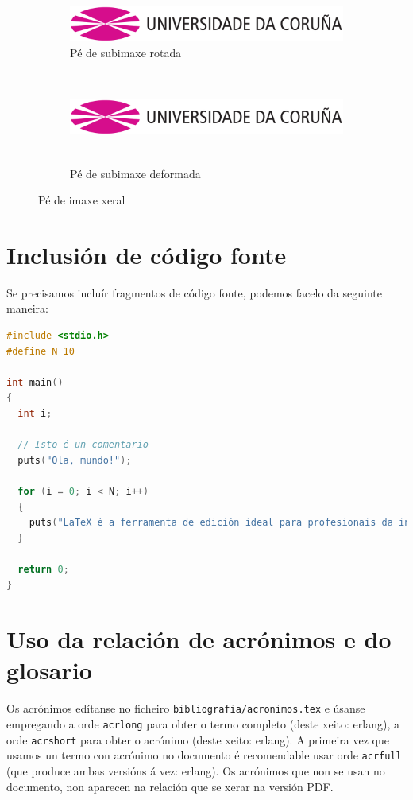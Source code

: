 \begin{figure}[hp!]
  \centering
  \begin{subfigure}[c]{0.3\textwidth}
    \includegraphics[angle=45,width=\textwidth]{imaxes/udc.png}
    \caption{Pé de subimaxe rotada}
    \label{fig:subfigura-rotada}
  \end{subfigure}
  \hspace{0.1\textwidth}
  \begin{subfigure}[c]{0.3\textwidth}
    \includegraphics[width=\textwidth,height=3cm]{imaxes/udc.png}
    \caption{Pé de subimaxe deformada}
    \label{fig:subfigura-deformada}
  \end{subfigure}
  \caption{Pé de imaxe xeral}
  \label{fig:exemplo-subfiguras}
\end{figure}

\section{Inclusión de código fonte}

Se precisamos incluír fragmentos de código fonte, podemos facelo da
seguinte maneira:

\begin{lstlisting}[language=C]
#include <stdio.h>
#define N 10

int main()
{
  int i;

  // Isto é un comentario
  puts("Ola, mundo!");

  for (i = 0; i < N; i++)
  {
    puts("LaTeX é a ferramenta de edición ideal para profesionais da informática!");
  }

  return 0;
}
\end{lstlisting}

\section{Uso da relación de acrónimos e do glosario}

Os acrónimos edítanse no ficheiro \texttt{bibliografia/acronimos.tex}
e úsanse empregando a orde \texttt{acrlong} para obter o termo
completo (deste xeito: \acrlong{erlang}), a orde \texttt{acrshort}
para obter o acrónimo (deste xeito: \acrshort{erlang}). A primeira vez
que usamos un termo con acrónimo no documento é recomendable usar orde
\texttt{acrfull} (que produce ambas versións á vez:
\acrfull{erlang}). Os acrónimos que non se usan no documento, non
aparecen na relación que se xerar na versión PDF.

